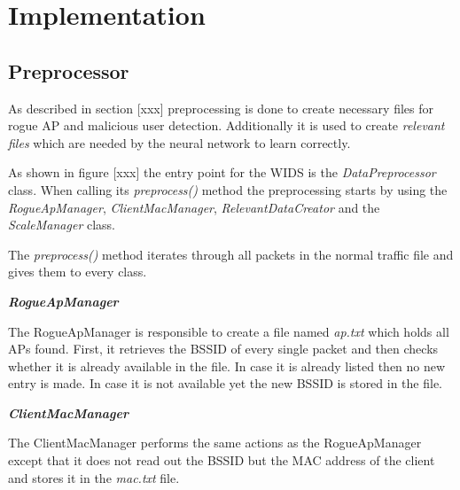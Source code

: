 






































\section{Implementation}

\subsection{Preprocessor}

As described in section [xxx] preprocessing is done to create necessary files for rogue AP and malicious user detection. Additionally it is used to create {\em relevant files} which are needed by the neural network to learn correctly.

As shown in figure [xxx] the entry point for the WIDS is the {\em DataPreprocessor} class. When calling its {\em preprocess()} method the preprocessing starts by using the {\em RogueApManager}, {\em ClientMacManager}, {\em RelevantDataCreator} and the {\em ScaleManager} class.

The {\em preprocess()} method iterates through all packets in the normal traffic file and gives them to every class.

{\em {\bf RogueApManager}}

The RogueApManager is responsible to create a file named {\em ap.txt} which holds all APs found. First, it retrieves the BSSID of every single packet and then checks whether it is already available in the file. In case it is already listed then no new entry is made. In case it is not available yet the new BSSID is stored in the file.

{\em {\bf ClientMacManager}}

The ClientMacManager performs the same actions as the RogueApManager except that it does not read out the BSSID but the MAC address of the client and stores it in the {\em mac.txt} file.

